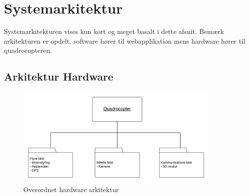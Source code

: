 \chapter{Systemarkitektur}
\label{chap:arkitektur}

Systemarkitekturen vises kun kort og meget basalt i dette afsnit.
Bemærk arkitekturen er opdelt, software hører til webapplikation mens hardware hører til quadrocopteren.


\section{Arkitektur Hardware}
\label{sec:Arkitektur hw}

\begin{figure}[H]
\centering
\includegraphics[width=0.9\textwidth]{Billeder/hw_arkitektur.png}
\caption{Overordnet hardware arkitektur}
\label{fig:hw_arkitektur}
\end{figure}		

